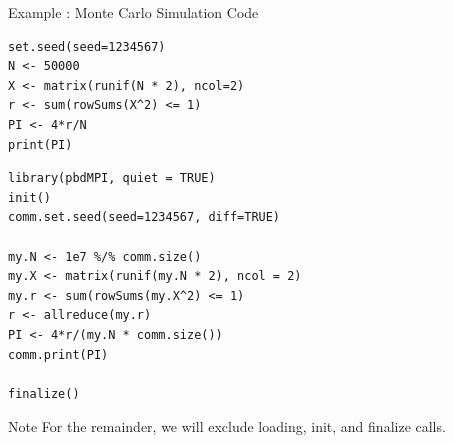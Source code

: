 \begin{frame}[fragile]
  \begin{exampleblock}{Example \showex :  Monte Carlo Simulation Code}\pause
\begin{lstlisting}[title=Serial Code]
set.seed(seed=1234567)
N <- 50000
X <- matrix(runif(N * 2), ncol=2)
r <- sum(rowSums(X^2) <= 1)
PI <- 4*r/N
print(PI)
\end{lstlisting}

\begin{lstlisting}[title=Parallel Code]
library(pbdMPI, quiet = TRUE)
init()
comm.set.seed(seed=1234567, diff=TRUE)

my.N <- 1e7 %/% comm.size()
my.X <- matrix(runif(my.N * 2), ncol = 2)
my.r <- sum(rowSums(my.X^2) <= 1)
r <- allreduce(my.r)
PI <- 4*r/(my.N * comm.size())
comm.print(PI)

finalize()
\end{lstlisting}
  \end{exampleblock}
\end{frame}

\begin{frame}[fragile]
  \begin{block}{Note}\pause
    For the remainder, we will exclude loading, init, and finalize calls.
  \end{block}
\end{frame}



